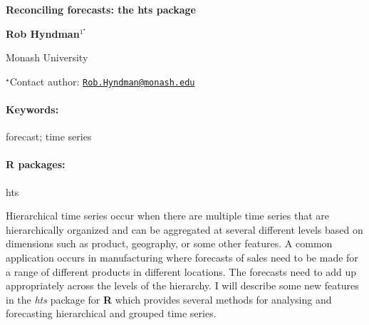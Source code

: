 \documentclass[11pt, a4paper]{article}
\renewcommand{\title}[1]{\begin{center}{\bf \LARGE #1}\end{center}}
\newcommand{\keywords}{\paragraph{Keywords:}}
\newcommand{\packages}{\paragraph{R packages:}}
\begin{document}
\pagestyle{empty}

\title{Reconciling forecasts: the hts package}

\begin{center}
  {\bf Rob Hyndman$^{1^\star}$}
\end{center}

\vskip 0.3cm

\begin{affiliations}
\begin{enumerate}
\begin{minipage}{0.915\textwidth}
\centering
\item Monash University \\[-2pt]
\end{minipage}
\end{enumerate}
$^\star$Contact author: \href{mailto:Rob.Hyndman@monash.edu}{\nolinkurl{Rob.Hyndman@monash.edu}}\\
\end{affiliations}

\vskip 0.5cm

\begin{minipage}{0.915\textwidth}
\keywords forecast; time series
\packages hts
\end{minipage}

\vskip 0.8cm

Hierarchical time series occur when there are multiple time series that
are hierarchically organized and can be aggregated at several different
levels based on dimensions such as product, geography, or some other
features. A common application occurs in manufacturing where forecasts
of sales need to be made for a range of different products in different
locations. The forecasts need to add up appropriately across the levels
of the hierarchy. I will describe some new features in the \emph{hts}
package for \textbf{R} which provides several methods for analysing and
forecasting hierarchical and grouped time series.
\end{document}
